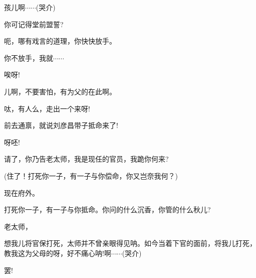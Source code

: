 {孩儿啊$\cdots{}\cdots{}$({\hwfs 哭}{\hwfs 介})}



{你可记得堂前盟誓?}

{呃，哪有戏言的道理，你快快放手。}

{你不放手，我就$\cdots{}\cdots{}$}

{唉呀!}\hspace{20pt}~

{\vspace{5pt}}

{儿啊，不要害怕，有为父的在此啊。}

{呔，有人么，走出一个来呀!}

{前去通禀，就说刘彦昌带子抵命来了!}

{呀呸!}\hspace{20pt}~

{请了，你乃告老太师，我是现任的官员，我跪你何来?}

{(住了！打死你一子，有一子与你偿命，你又岂奈我何？)}

{现在府外。}

{打死你一子，有一子与你抵命。你问的什么沉香，你管的什么秋儿?}

{老太师，}\hspace{10pt}~

{想我儿将官保打死，太师并不曾亲眼得见呐。如今当着下官的面前，将我儿打死，教我这为父母的呀，好不痛心呐!啊$\cdots{}\cdots{}$({\hwfs 哭}{\hwfs 介})}

{罢!}\hspace{30pt}~
